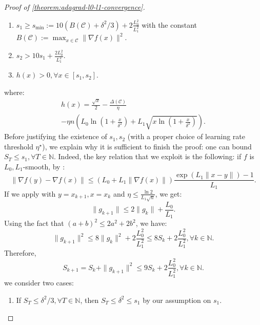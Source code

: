 \documentclass{article}
\theoremstyle{plain}
\theoremstyle{definition}
\theoremstyle{remark}
\newcommand*{\cC}{\mathcal{C}}
\newcommand*{\NN}{\mathbb{N}}
\begin{document}
\begin{proof}[Proof of \cref{theorem:adagrad-l0-l1-convergence}]
    \begin{enumerate}[leftmargin=*]
    \item $s_1 \geq s_{\min}:= 10(B(\cC)+ \delta^2 / 3) + 2\frac{L_0^2}{L_1^2}$
    with the constant $B(\cC):= \max_{x \in \mathcal{C}} \|\nabla f(x)\|^2$.
    \item $s_2 > 10 s_1 + \frac{2L_0^2}{L_1^2}$.
    \item $h(x) > 0, \forall x \in [s_1,s_2]$.
    \end{enumerate}
    where:
    \begin{multline*}
        h(x) = \frac{\sqrt{x}}{2} - \frac{\Delta(\mathcal{C})}{\eta} \\ -\eta n \left(L_0\ln\left(1 + \frac{x}{\delta^2}\right) + L_1\sqrt{x\ln\left(1 + \frac{x}{\delta^2}\right)}\right).
    \end{multline*}
    Before justifying the existence of $s_1,s_2$ (with a proper choice of learning rate threshold $\eta^\star$), we explain why it is sufficient to finish the proof: one can bound $S_T \leq s_1, \forall T \in \NN$. Indeed, the key relation that we exploit is the following: if $f$ is $L_0,L_1$-smooth, by \citet[Lemma 2.5]{vankov2025optimizing}:
    \begin{equation}
        \label{eq:gradient-relation}
        \|\nabla f(y) - \nabla f(x)\| \leq (L_0 + L_1\|\nabla f(x)\|)\frac{\exp(L_1\|x-y\|) - 1}{L_1}.
    \end{equation}
    If we apply  with $y = x_{k + 1}, x = x_{k}$ and $\eta \leq \frac{\ln 2}{L_1\sqrt{n}}$, we get:
    \begin{equation*}
        \|g_{k + 1}\| \leq 2\|g_k\| + \frac{L_0}{L_1}.
    \end{equation*}
    Using the fact that $(a + b)^2 \leq 2a^2 + 2b^2$, we have:
    \begin{equation*}
        \|g_{k + 1}\|^2 \leq 8\|g_k\|^2 + 2\frac{L_0^2}{L_1^2} \leq 8S_k + 2\frac{L_0^2}{L_1^2}, \forall k \in \NN.
    \end{equation*}
    Therefore,
    \begin{equation}
        \label{eq:next-G-k-estimation}
        S_{k + 1} = S_k + \|g_{k+1}\|^2 \leq 9S_k + 2\frac{L_0^2}{L_1^2}, \forall k \in \NN.
    \end{equation}
    we consider two cases:
    \begin{enumerate}[leftmargin=*]
        \item If $S_T \leq \delta^2/3, \forall T \in \NN$, then $S_T \leq \delta^2 \leq s_1$ by our assumption on $s_1$.

\end{enumerate}
\end{proof}
\end{document}
